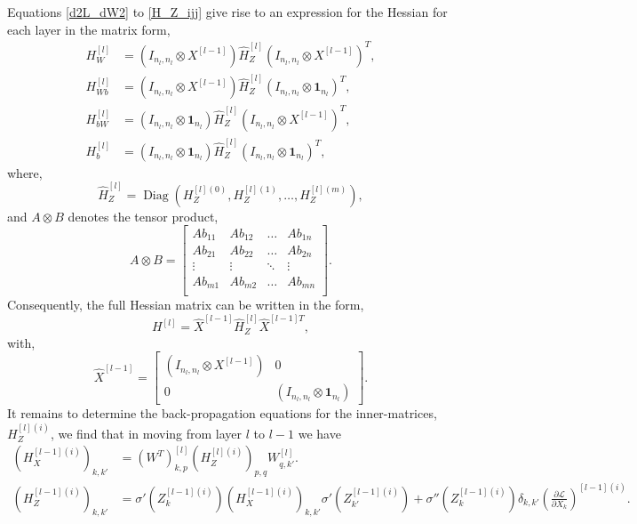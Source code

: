 \documentclass[nohyperref]{article}
\theoremstyle{plain}
\theoremstyle{definition}
\theoremstyle{remark}
\DeclareMathOperator*{\Diag}{Diag}
\begin{document}
Equations \ref{d2L_dW2} to \ref{H_Z_ijj} give rise to an expression for the Hessian for each layer in the matrix form,
\begin{align}
H_W^{[l]}&=(I_{n_l,n_l} \otimes X^{[l-1]})\widehat{H}_Z^{[l]}(I_{n_l,n_l} \otimes X^{[l-1]})^T,\label{H_W_calc}\\
H_{Wb}^{[l]}&=(I_{n_l,n_l} \otimes X^{[l-1]}) \widehat{H}_Z^{[l]}(I_{n_l,n_l} \otimes \mathbf{1}_{n_l})^T,\label{H_Wb_calc}\\
H_{bW}^{[l]}&=(I_{n_l,n_l} \otimes \mathbf{1}_{n_l})\widehat{H}_Z^{[l]}(I_{n_l,n_l} \otimes X^{[l-1]})^T,\label{H_bW_calc}\\
H_{b}^{[l]}&=(I_{n_l,n_l} \otimes \mathbf{1}_{n_l})\widehat{H}_Z^{[l]}(I_{n_l,n_l} \otimes \mathbf{1}_{n_l})^T,\label{H_b_calc}
\end{align}
where,
\begin{equation}
\widehat{H}_Z^{[l]}=\Diag{(H_Z^{[l](0)},H_Z^{[l](1)},\ldots,H_Z^{[l](m)})},
\end{equation}
and $A \otimes B$ denotes the tensor product,
\begin{equation}
A \otimes B=\left[\begin{array}{cccc}
A b_{11} & A b_{12} & \ldots  &A b_{1n}\\
A b_{21} & A b_{22} & \ldots &A b_{2n}\\
\vdots & \vdots & \ddots &\vdots\\
A b_{m1} & A b_{m2} & \ldots &A b_{mn}\\
\end{array}
\right].
\end{equation}
Consequently, the full Hessian matrix can be written in the form,
\begin{equation}
H^{[l]}=\widehat{X}^{[l-1]} \widehat{H}_Z^{[l]}\widehat{X}^{[l-1]T},\label{full_Hdefn}
\end{equation}
with,
\begin{equation}
\widehat{X}^{[l-1]}= \left[
\begin{array}{cc}
(I_{n_l,n_l} \otimes X^{[l-1]}) & 0 \\
0 & (I_{n_l,n_l} \otimes \mathbf{1}_{n_l})
\end{array}
\right] .
\end{equation}
It remains to determine the back-propagation equations for the inner-matrices, $H_Z^{[l](i)}$, we find that in moving from layer $l$ to $l-1$ we have
\begin{align}
(H_X^{[l-1](i)})_{k,k'}&=\left(W^{T}\right)_{k,p}^{[l]} (H_Z^{[l](i)})_{p,q}W_{q,k'}^{[l]}.\label{backprop_HX}\\
(H_Z^{[l-1](i)})_{k,k'}&=\sigma'{(Z_{k}^{[l-1](i)})}(H_X^{[l-1](i)})_{k,k'} \sigma'{(Z_{k'}^{[l-1](i)})}+\sigma''{(Z_{k}^{[l-1](i)})}\delta_{k,k'}\left(\frac{\partial \mathcal{L}}{\partial X_{k}}\right)^{[l-1](i)}\label{backprop_HZ}.
\end{align}
\end{document}
